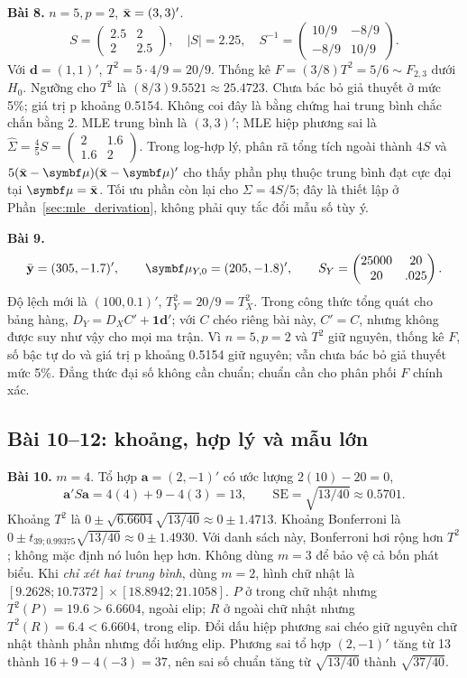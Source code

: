 \noindent\textbf{Bài 8.}
$n=5,p=2$, $\bar{\mathbf x}=(3,3)'$.
\[
 S=\begin{pmatrix}2.5&2\\2&2.5\end{pmatrix},\quad
 |S|=2.25,\quad
 S^{-1}=\begin{pmatrix}10/9&-8/9\\-8/9&10/9\end{pmatrix}.
\]
Với $\mathbf d=(1,1)'$, $T^2=5\cdot4/9=20/9$.
Thống kê $F=(3/8)T^2=5/6\sim F_{2,3}$ dưới $H_0$.
Ngưỡng cho $T^2$ là $(8/3)9.5521\approx25.4723$.
Chưa bác bỏ giả thuyết ở mức 5\%; giá trị p khoảng 0.5154.
Không coi đây là bằng chứng hai trung bình chắc chắn bằng 2.
MLE trung bình là $(3,3)'$; MLE hiệp phương sai là
$\widehat\Sigma=\frac45S=\begin{pmatrix}2&1.6\\1.6&2\end{pmatrix}$.
Trong log-hợp lý, phân rã tổng tích ngoài thành $4S$ và
$5(\xbar-\vmu)(\xbar-\vmu)'$ cho thấy phần phụ thuộc trung bình
đạt cực đại tại $\vmu=\xbar$. Tối ưu phần còn lại cho $\Sigma=4S/5$;
đây là thiết lập ở Phần~\ref{sec:mle_derivation}, không phải quy tắc
đổi mẫu số tùy ý.

\noindent\textbf{Bài 9.}
\[
 \bar{\mathbf y}=(305,-1.7)',\qquad\vmu_{Y,0}=(205,-1.8)',
 \qquad S_Y=\begin{pmatrix}25000&20\\20&.025\end{pmatrix}.
\]
Độ lệch mới là $(100,0.1)'$, $T_Y^2=20/9=T_X^2$.
Trong công thức tổng quát cho bảng hàng, $D_Y=D_XC'+\mathbf1\mathbf d'$;
với $C$ chéo riêng bài này, $C'=C$, nhưng không được suy như vậy cho mọi ma trận.
Vì $n=5,p=2$ và $T^2$ giữ nguyên, thống kê $F$, số bậc tự do và giá trị
p khoảng 0.5154 giữ nguyên; vẫn chưa bác bỏ giả thuyết mức 5\%.
Đẳng thức đại số không cần chuẩn; chuẩn cần cho phân phối $F$ chính xác.

\subsection*{Bài 10--12: khoảng, hợp lý và mẫu lớn}
\noindent\textbf{Bài 10.}
$m=4$. Tổ hợp $\mathbf a=(2,-1)'$ có ước lượng $2(10)-20=0$,
\[
 \mathbf a'S\mathbf a=4(4)+9-4(3)=13,\qquad
 \mathrm{SE}=\sqrt{13/40}\approx0.5701.
\]
Khoảng $T^2$ là $0\pm\sqrt{6.6604}\sqrt{13/40}\approx0\pm1.4713$.
Khoảng Bonferroni là $0\pm t_{39;0.99375}\sqrt{13/40}
\approx0\pm1.4930$.
Với danh sách này, Bonferroni hơi rộng hơn $T^2$; không mặc định nó luôn
hẹp hơn. Không dùng $m=3$ để bảo vệ cả bốn phát biểu.
Khi \emph{chỉ xét hai trung bình}, dùng $m=2$, hình chữ nhật là
$[9.2628;10.7372]\times[18.8942;21.1058]$.
$P$ ở trong chữ nhật nhưng $T^2(P)=19.6>6.6604$, ngoài elip;
$R$ ở ngoài chữ nhật nhưng $T^2(R)=6.4<6.6604$, trong elip.
Đổi dấu hiệp phương sai chéo giữ nguyên chữ nhật thành phần nhưng đổi
hướng elip. Phương sai tổ hợp $(2,-1)'$ tăng từ 13 thành
$16+9-4(-3)=37$, nên sai số chuẩn tăng từ $\sqrt{13/40}$
thành $\sqrt{37/40}$.

